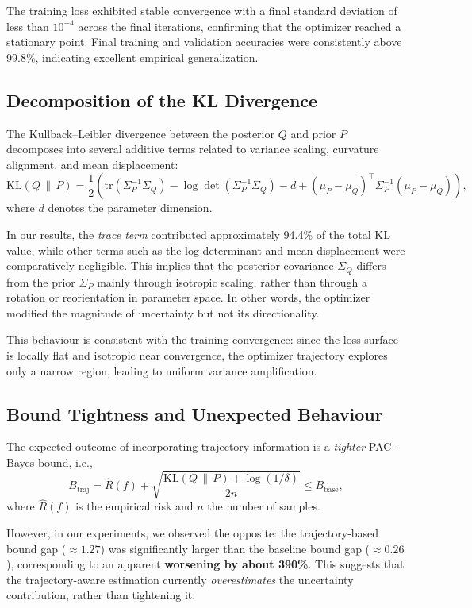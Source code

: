 The training loss exhibited stable convergence with a final standard deviation of less than $10^{-4}$ across the final iterations, confirming that the optimizer reached a stationary point. Final training and validation accuracies were consistently above 99.8\%, indicating excellent empirical generalization.

\subsection{Decomposition of the KL Divergence}

The Kullback--Leibler divergence between the posterior $Q$ and prior $P$ decomposes into several additive terms related to variance scaling, curvature alignment, and mean displacement:
\[
\mathrm{KL}(Q \,\|\, P) = \frac{1}{2}\left( \mathrm{tr}\left(\Sigma_P^{-1}\Sigma_Q\right) - \log \det \left(\Sigma_P^{-1}\Sigma_Q\right) - d + (\mu_P - \mu_Q)^\top \Sigma_P^{-1}(\mu_P - \mu_Q) \right),
\]
where $d$ denotes the parameter dimension.

In our results, the \emph{trace term} contributed approximately 94.4\% of the total KL value, while other terms such as the log-determinant and mean displacement were comparatively negligible. This implies that the posterior covariance $\Sigma_Q$ differs from the prior $\Sigma_P$ mainly through isotropic scaling, rather than through a rotation or reorientation in parameter space. In other words, the optimizer modified the magnitude of uncertainty but not its directionality. 

This behaviour is consistent with the training convergence: since the loss surface is locally flat and isotropic near convergence, the optimizer trajectory explores only a narrow region, leading to uniform variance amplification.

\subsection{Bound Tightness and Unexpected Behaviour}

The expected outcome of incorporating trajectory information is a \emph{tighter} PAC-Bayes bound, i.e.,
\[
B_{\text{traj}} = \widehat{R}(f) + \sqrt{\frac{\mathrm{KL}(Q\,\|\,P) + \log(1/\delta)}{2n}} \le B_{\text{base}},
\]
where $\widehat{R}(f)$ is the empirical risk and $n$ the number of samples.

However, in our experiments, we observed the opposite: the trajectory-based bound gap ($\approx 1.27$) was significantly larger than the baseline bound gap ($\approx 0.26$), corresponding to an apparent \textbf{worsening by about 390\%}. This suggests that the trajectory-aware estimation currently \emph{overestimates} the uncertainty contribution, rather than tightening it.


